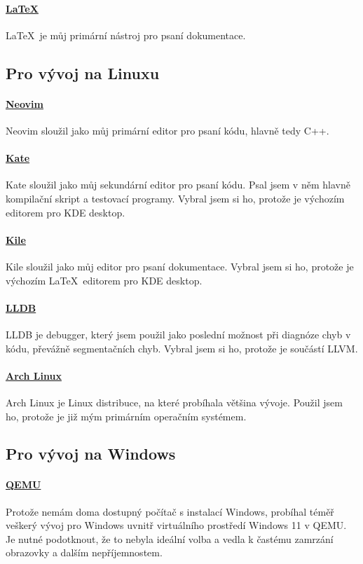 \documentclass[12pt, a4paper, titlepage, abstract=on]{scrreprt}
\begin{document}
\paragraph{\href{https://www.latex-project.org/}{\LaTeX}}
\LaTeX\ je můj primární nástroj pro psaní dokumentace.
\subsection{Pro vývoj na Linuxu}
\paragraph{\href{https://neovim.io/}{Neovim}}
Neovim sloužil jako můj primární editor pro psaní kódu, hlavně tedy C++.
\paragraph{\href{https://apps.kde.org/kate/}{Kate}}
Kate sloužil jako můj sekundární editor pro psaní kódu. Psal jsem v něm hlavně kompilační skript a testovací programy. Vybral jsem si ho, protože
je výchozím editorem pro KDE desktop.
\paragraph{\href{https://apps.kde.org/kile/}{Kile}}
Kile sloužil jako můj editor pro psaní dokumentace. Vybral jsem si ho, protože je výchozím \LaTeX\ editorem pro KDE desktop.
\paragraph{\href{https://lldb.llvm.org/}{LLDB}}
LLDB je debugger, který jsem použil jako poslední možnost při diagnóze chyb v kódu, převážně segmentačních chyb. Vybral jsem si ho, protože je součástí LLVM.
\paragraph{\href{https://archlinux.org/}{Arch Linux}}
Arch Linux je Linux distribuce, na které probíhala většina vývoje. Použil jsem ho, protože je již mým primárním operačním systémem.
\subsection{Pro vývoj na Windows}
\paragraph{\href{https://www.qemu.org/}{QEMU}}
Protože nemám doma dostupný počítač s instalací Windows, probíhal téměř veškerý vývoj pro Windows uvnitř virtuálního prostředí Windows 11 v QEMU. Je nutné
podotknout, že to nebyla ideální volba a vedla k častému zamrzání obrazovky a dalším nepříjemnostem.
\end{document}
